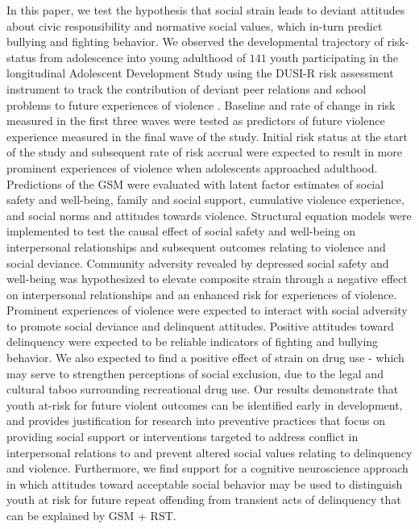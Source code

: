 \documentclass[utf8]{article}
\begin{document}
In this paper, we test the hypothesis that social strain leads to deviant attitudes about civic responsibility and normative social values, which in-turn predict bullying and fighting behavior. We observed the developmental trajectory of risk-status from adolescence into young adulthood of $141$ youth participating in the longitudinal Adolescent Development Study \citep{Fishbein2016} using the DUSI-R risk assessment instrument to track the contribution of deviant peer relations and school problems to future experiences of violence \citep{tarter1994reliability}. Baseline and rate of change in risk measured in the first three waves were tested as predictors of future violence experience measured in the final wave of the study. Initial risk status at the start of the study and subsequent rate of risk accrual were expected to result in more prominent experiences of violence when adolescents approached adulthood. Predictions of the GSM were evaluated with latent factor estimates of social safety and well-being, family and social support, cumulative violence experience, and social norms and attitudes towards violence. Structural equation models were implemented to test the causal effect of social safety and well-being on interpersonal relationships and subsequent outcomes relating to violence and social deviance. Community adversity revealed by depressed social safety and well-being was hypothesized to elevate composite strain through a negative effect on interpersonal relationships and an enhanced risk for experiences of violence. Prominent experiences of violence were expected to interact with social adversity to promote social deviance and delinquent attitudes. Positive attitudes toward delinquency were expected to be reliable indicators of fighting and bullying behavior. We also expected to find a positive effect of strain on drug use - which may serve to strengthen perceptions of social exclusion, due to the legal and cultural taboo surrounding recreational drug use. Our results demonstrate that youth at-risk for future violent outcomes can be identified early in development, and provides justification for research into preventive practices that focus on providing social support or interventions targeted to address conflict in interpersonal relations to and prevent altered social values relating to delinquency and violence. Furthermore, we find support for a cognitive neuroscience approach in which attitudes toward acceptable social behavior may be used to distinguish youth at risk for future repeat offending from transient acts of delinquency that can be explained by GSM + RST.
\end{document}
